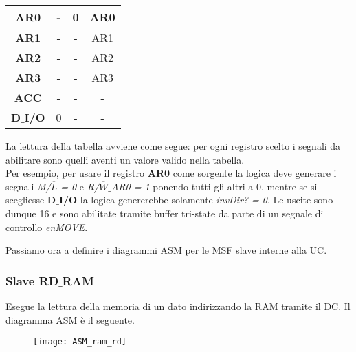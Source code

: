 \begin{table}[H]
\begin{tabular}{|p{25mm}|p{5mm}|p{5mm}|p{25mm}|}
		\hline
		\multicolumn{1}{|c|}{\textbf{AR0}} &
		\multicolumn{1}{c|}{-} &
		\multicolumn{1}{|c|}{0} &
		\multicolumn{1}{c|}{AR0}\\
		
		\hline
		\multicolumn{1}{|c|}{\textbf{AR1}} &
		\multicolumn{1}{c|}{-} &
		\multicolumn{1}{|c|}{-} &
		\multicolumn{1}{c|}{AR1}\\
		
		\hline
		\multicolumn{1}{|c|}{\textbf{AR2}} &
		\multicolumn{1}{c|}{-} &
		\multicolumn{1}{|c|}{-} &
		\multicolumn{1}{c|}{AR2}\\
		
		\hline
		\multicolumn{1}{|c|}{\textbf{AR3}} &
		\multicolumn{1}{c|}{-} &
		\multicolumn{1}{|c|}{-} &
		\multicolumn{1}{c|}{AR3}\\
		
		\hline
		\multicolumn{1}{|c|}{\textbf{ACC}} &
		\multicolumn{1}{c|}{-} &
		\multicolumn{1}{|c|}{-} &
		\multicolumn{1}{c|}{-}\\
		
		\hline
		\multicolumn{1}{|c|}{\textbf{D$\_$I/O}} &
		\multicolumn{1}{c|}{0} &
		\multicolumn{1}{|c|}{-} &
		\multicolumn{1}{c|}{-}\\
		\hline
	\end{tabular}
\end{table}
\noindent
La lettura della tabella avviene come segue: per ogni registro scelto i segnali da abilitare sono quelli aventi un valore valido nella tabella.\\
Per esempio, per usare il registro \textbf{AR0} come sorgente la logica deve generare i segnali \textit{M/$\overline{L}$ = 0} e \textit{R/$\overline{W}\_$AR0 = 1} ponendo tutti gli altri a 0, mentre se si scegliesse \textbf{D$\_$I/O} la logica genererebbe solamente \textit{invDir? = 0}. Le uscite sono dunque 16 e sono abilitate tramite buffer tri-state da parte di un segnale di controllo \textit{enMOVE}.
\par \bigskip \noindent
Passiamo ora a definire i diagrammi ASM per le MSF slave interne alla UC.
\newpage
\subsubsection{Slave RD$\_$RAM}
Esegue la lettura della memoria di un dato indirizzando la RAM tramite il DC. Il diagramma ASM è il seguente.
\begin{figure}[H]
	\centering
	\texttt{[image: ASM\_ram\_rd]}
	\label{fig:asm_ram_rd}
\end{figure}

